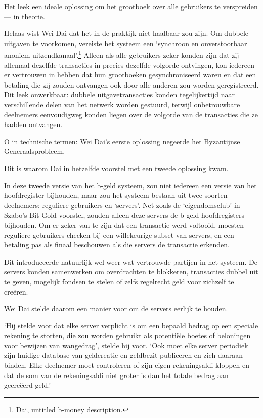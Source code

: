 \documentclass[smalldemyvopaper,11pt,twoside,onecolumn,openright,extrafontsizes,hidelinks]{memoir}
\begin{document}
Het leek een ideale oplossing om het grootboek over alle gebruikers te
verspreiden --- in theorie.

Helaas wist Wei Dai dat het in de praktijk niet haalbaar zou zijn. Om
dubbele uitgaven te voorkomen, vereiste het systeem een `synchroon en
onverstoorbaar anoniem uitzendkanaal'.\footnote{Dai, untitled b-money
  description.} Alleen als alle gebruikers zeker konden zijn dat zij
allemaal dezelfde transacties in precies dezelfde volgorde ontvingen,
kon iedereen er vertrouwen in hebben dat hun grootboeken
gesynchroniseerd waren en dat een betaling die zij zouden ontvangen ook
door alle anderen zou worden geregistreerd. Dit leek onwerkbaar: dubbele
uitgavetransacties konden tegelijkertijd naar verschillende delen van
het netwerk worden gestuurd, terwijl onbetrouwbare deelnemers
eenvoudigweg konden liegen over de volgorde van de transacties die ze
hadden ontvangen.

O in technische termen: Wei Dai's eerste oplossing negeerde het
Byzantijnse Generaalsprobleem.

Dit is waarom Dai in hetzelfde voorstel met een tweede oplossing kwam.

In deze tweede versie van het b-geld systeem, zou niet iedereen een
versie van het hoofdregister bijhouden, maar zou het systeem bestaan uit
twee soorten deelnemers: reguliere gebruikers en `servers'. Net zoals de
`eigendomsclub' in Szabo's Bit Gold voorstel, zouden alleen deze servers
de b-geld hoofdregisters bijhouden. Om er zeker van te zijn dat een
transactie werd voltooid, moesten reguliere gebruikers checken bij een
willekeurige subset van servers, en een betaling pas als finaal
beschouwen als die servers de transactie erkenden.

Dit introduceerde natuurlijk wel weer wat vertrouwde partijen in het
systeem. De servers konden samenwerken om overdrachten te blokkeren,
transacties dubbel uit te geven, mogelijk fondsen te stelen of zelfs
regelrecht geld voor zichzelf te creëren.

Wei Dai stelde daarom een manier voor om de servers eerlijk te houden.

`Hij stelde voor dat elke server verplicht is om een bepaald bedrag op
een speciale rekening te storten, die zou worden gebruikt als potentiële
boetes of beloningen voor bewijzen van wangedrag', stelde hij voor. `Ook
moet elke server periodiek zijn huidige database van geldcreatie en
geldbezit publiceren en zich daaraan binden. Elke deelnemer moet
controleren of zijn eigen rekeningsaldi kloppen en dat de som van de
rekeningsaldi niet groter is dan het totale bedrag aan gecreëerd geld.'
\end{document}
